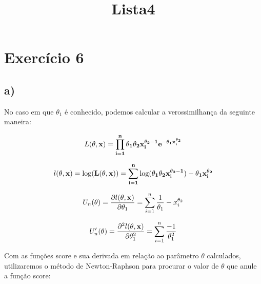 \documentclass[11pt]{article}
\title{Lista4}
\begin{document}
    
    
    \maketitle
    
    

    
    \hypertarget{exercuxedcio-6}{%
\section{Exercício 6}\label{exercuxedcio-6}}

\hypertarget{a}{%
\subsection{a)}\label{a}}

No caso em que \(\theta _1\) é conhecido, podemos calcular a
verossimilhança da seguinte maneira:

\[ L(\bf{\theta}, \bf{x}) = \prod_{i = 1}^{n} \theta_1 \theta_2 x_i^{\theta_2  -1} e^{-\theta_ 1 x_i^{\theta_ 2}} \]

\[ l(\bf{\theta}, \bf{x}) = \log (L(\bf{\theta}, \bf{x})) = \sum_{i = 1}^{n} \log(\theta_1 \theta_2 x_i^{\theta_2  -1}) -\theta_ 1 x_i^{\theta_ 2}  \]

\[ U_n({\theta}) = \frac{\partial l(\bf{\theta}, \bf{x})}{\partial \theta_1} = \sum_{i = 1}^{n} \frac{1}{\theta_1} - x_i ^{\theta_2} \]

\[ U_n'({\theta}) = \frac{\partial^2 l(\bf{\theta}, \bf{x})}{\partial \theta_1^2} = \sum_{i = 1}^{n} \frac{-1}{\theta_ 1^2}\]

Com as funções score e sua derivada em relação ao parâmetro \(\theta\)
calculados, utilizaremos o método de Newton-Raphson para procurar o
valor de \(\theta\) que anule a função score:
\end{document}
